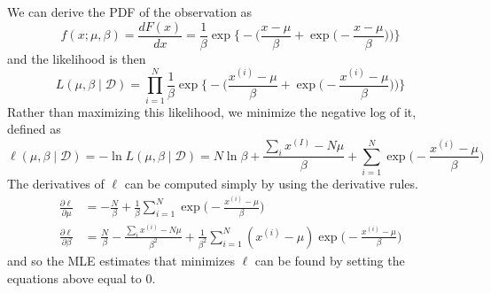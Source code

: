   \begin{solution}
    We can derive the PDF of the observation as 
    \begin{equation}
      f(x; \mu, \beta) = \frac{d F(x)}{dx} = \frac{1}{\beta} \exp \bigg\{ - \bigg( \frac{x - \mu}{\beta} + \exp \Big( - \frac{x - \mu}{\beta}\Big) \bigg) \bigg\}
    \end{equation}
    and the likelihood is then 
    \begin{equation}
      L(\mu, \beta \mid \mathcal{D}) = \prod_{i=1}^N \frac{1}{\beta} \exp \bigg\{ - \bigg( \frac{x^{(i)} - \mu}{\beta} + \exp \Big( - \frac{x^{(i)} - \mu}{\beta}\Big) \bigg) \bigg\}
    \end{equation}
    Rather than maximizing this likelihood, we minimize the negative log of it, defined as 
    \begin{equation}
      \ell(\mu, \beta \mid \mathcal{D}) = - \ln L(\mu, \beta \mid \mathcal{D}) = N \ln{\beta} + \frac{\sum_{i} x^{(I)} - N \mu}{\beta} + \sum_{i=1}^N \exp \Big( - \frac{x^{(i)} - \mu}{\beta} \Big)
    \end{equation}
    The derivatives of $\ell$ can be computed simply by using the derivative rules.  
    \begin{align}
      \frac{\partial \ell}{\partial \mu} & = - \frac{N}{\beta} + \frac{1}{\beta} \sum_{i=1}^N \exp \Big( - \frac{x^{(i)} - \mu}{\beta} \Big) \\
      \frac{\partial \ell}{\partial \beta} & = \frac{N}{\beta} - \frac{\sum_{i} x^{(i)} - N \mu}{\beta^2} + \frac{1}{\beta^2} \sum_{i=1}^N (x^{(i)} - \mu) \exp \Big( - \frac{x^{(i)} - \mu}{\beta} \Big)
    \end{align}
    and so the MLE estimates that minimizes $\ell$ can be found by setting the equations above equal to $0$. 
  \end{solution}

